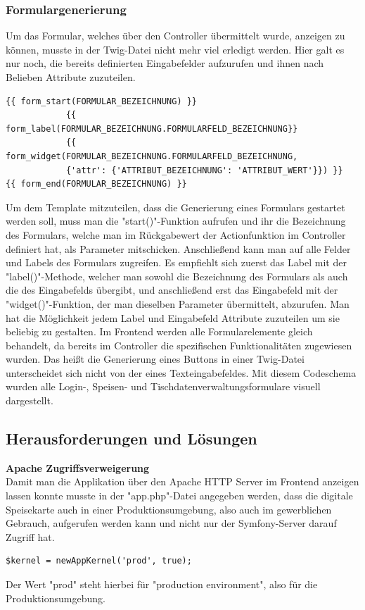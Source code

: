     \subsubsection{Formulargenerierung}

Um das Formular, welches über den Controller übermittelt wurde, anzeigen zu können, musste in der Twig-Datei nicht mehr viel erledigt werden. Hier galt es nur noch, die bereits definierten Eingabefelder aufzurufen und ihnen nach Belieben Attribute zuzuteilen.
\lstset{language = java}
  	\begin{lstlisting}
{{ form_start(FORMULAR_BEZEICHNUNG) }}
            {{ form_label(FORMULAR_BEZEICHNUNG.FORMULARFELD_BEZEICHNUNG}}
            {{ form_widget(FORMULAR_BEZEICHNUNG.FORMULARFELD_BEZEICHNUNG,
            {'attr': {'ATTRIBUT_BEZEICHNUNG': 'ATTRIBUT_WERT'}}) }}
{{ form_end(FORMULAR_BEZEICHNUNG) }}
	\end{lstlisting}
Um dem Template mitzuteilen, dass die Generierung eines Formulars gestartet werden soll, muss man die "start()"-Funktion aufrufen und ihr die Bezeichnung des Formulars, welche man im Rückgabewert der Actionfunktion im Controller definiert hat, als Parameter mitschicken.
Anschließend kann man auf alle Felder und Labels des Formulars zugreifen. Es empfiehlt sich zuerst das Label mit der "label()"-Methode, welcher man sowohl die Bezeichnung des Formulars als auch die des Eingabefelds übergibt, und anschließend erst das Eingabefeld mit der "widget()"-Funktion, der man dieselben Parameter übermittelt, abzurufen. Man hat die Möglichkeit jedem Label und Eingabefeld Attribute zuzuteilen um sie beliebig zu gestalten. Im Frontend werden alle Formularelemente gleich behandelt, da bereits im Controller die spezifischen Funktionalitäten zugewiesen wurden. Das heißt die Generierung eines Buttons in einer Twig-Datei unterscheidet sich nicht von der eines Texteingabefeldes.
Mit diesem Codeschema wurden alle Login-, Speisen- und Tischdatenverwaltungsformulare visuell dargestellt.

  \subsection{Herausforderungen und Lösungen}

\textbf{Apache Zugriffsverweigerung}\\
Damit man die Applikation über den Apache HTTP Server im Frontend anzeigen lassen konnte musste in der "app.php"-Datei angegeben werden, dass die digitale Speisekarte auch in einer Produktionsumgebung, also auch im gewerblichen Gebrauch, aufgerufen werden kann und nicht nur der Symfony-Server darauf Zugriff hat.
	\lstset{language=php}
  	\begin{lstlisting}
$kernel = newAppKernel('prod', true);
  	\end{lstlisting}
Der Wert "prod" steht hierbei für "production environment", also für die Produktionsumgebung.

